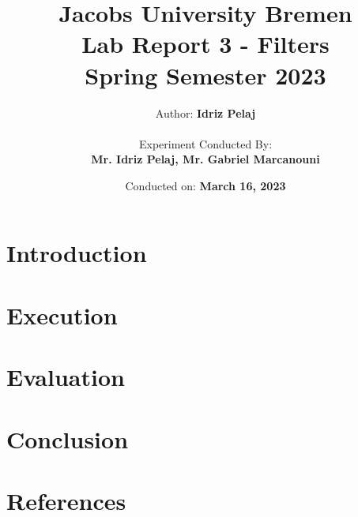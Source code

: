 \documentclass[12pt]{report}
\title{
    \textbf{Jacobs University Bremen} \\
    \vspace{1cm}
    \textbf{Lab Report 3 - Filters} \\ 
    Spring Semester 2023 \\
}
\author{
    Author: \textbf{Idriz Pelaj} \\
    \vspace{1cm} \\
    Experiment Conducted By: \\ \textbf{Mr. Idriz Pelaj, Mr. Gabriel Marcanouni}
}
\date{Conducted on: \textbf{March 16, 2023}}
\begin{document}
\maketitle

\chapter{Introduction}


\chapter{Execution}


\chapter{Evaluation}


\chapter{Conclusion}


\chapter{References}

\end{document}

